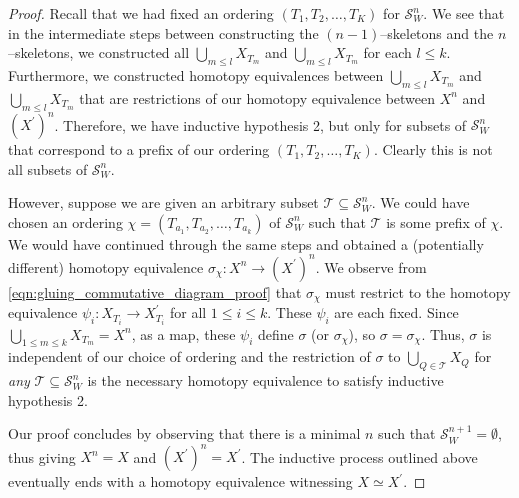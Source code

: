 \documentclass[class=article, crop=false]{standalone}
\begin{document}
\begin{proof}
    Recall that we had fixed an ordering $(T_1, T_2, \ldots , T_K)$ for $\mathcal{S}^{n}_W$. We see that in the intermediate steps between constructing the $(n-1)$--skeletons and the $n$--skeletons, we constructed all $\bigcup_{m \leq l} X_{T_m}$ and $\bigcup_{m \leq l} X_{T_m}$ for each $l\leq k$. Furthermore, we constructed homotopy equivalences between $\bigcup_{m \leq l} X_{T_m}$ and $\bigcup_{m \leq l} X_{T_m}$ that are restrictions of our homotopy equivalence between $X^n$ and $(X^\prime)^n$. Therefore, we have inductive hypothesis 2, but only for subsets of $\mathcal{S}_W^n$ that correspond to a prefix of our ordering $(T_1, T_2, \ldots , T_K)$. Clearly this is not all subsets of $\mathcal{S}_W^n$.
    
    However, suppose we are given an arbitrary subset $\mathcal{T} \subseteq \mathcal{S}_W^n$. We could have chosen an ordering $\chi = (T_{a_1}, T_{a_2}, \ldots, T_{a_k})$ of $\mathcal{S}^n_W$ such that $\mathcal{T}$ is some prefix of $\chi$. We would have continued through the same steps and obtained a (potentially different) homotopy equivalence $\sigma_\chi \colon X^n \to (X^\prime)^n$. We observe from \eqref{eqn:gluing_commutative_diagram_proof} that $\sigma_\chi$ must restrict to the homotopy equivalence $\psi_i \colon X_{T_i} \to X^\prime_{T_i}$ for all $1\leq i \leq k$. These $\psi_i$ are each fixed. Since $ \bigcup_{1\leq m\leq k} X_{T_m} = X^n$, as a map, these $\psi_i$ define $\sigma$ (or $\sigma_\chi$), so $\sigma = \sigma_\chi$. Thus, $\sigma$ is independent of our choice of ordering and the restriction of $\sigma$ to $\bigcup_{Q \in \mathcal{T}}X_Q$ for \emph{any} $\mathcal{T}\subseteq \mathcal{S}^n_W$ is the necessary homotopy equivalence to satisfy inductive hypothesis 2.
    
    Our proof concludes by observing that there is a minimal $n$ such that $\mathcal{S}^{n+1}_W = \emptyset$, thus giving $X^n = X$ and $(X^\prime)^n = X^\prime$. The inductive process outlined above eventually ends with a homotopy equivalence witnessing $X \simeq X^\prime$.
\end{proof}
\end{document}
